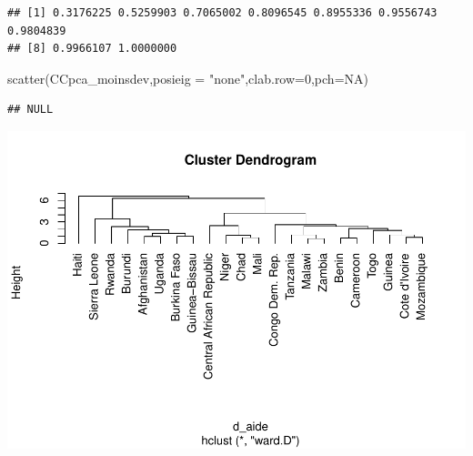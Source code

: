 \documentclass[
]{article}
\newenvironment{Shaded}{}{}
\newcommand{\AttributeTok}[1]{#1}
\newcommand{\ConstantTok}[1]{#1}
\newcommand{\DecValTok}[1]{#1}
\newcommand{\FunctionTok}[1]{#1}
\newcommand{\NormalTok}[1]{#1}
\newcommand{\SpecialCharTok}[1]{\textcolor[rgb]{0.00,0.50,0.50}{#1}}
\newcommand{\StringTok}[1]{\textcolor[rgb]{0.00,0.50,0.50}{#1}}
\begin{document}
\begin{verbatim}
## [1] 0.3176225 0.5259903 0.7065002 0.8096545 0.8955336 0.9556743 0.9804839
## [8] 0.9966107 1.0000000
\end{verbatim}

\begin{Shaded}
\begin{Highlighting}[]
\FunctionTok{scatter}\NormalTok{(CCpca\_moinsdev,}\AttributeTok{posieig =} \StringTok{"none"}\NormalTok{,}\AttributeTok{clab.row=}\DecValTok{0}\NormalTok{,}\AttributeTok{pch=}\ConstantTok{NA}\NormalTok{)}
\end{Highlighting}
\end{Shaded}

\begin{verbatim}
## NULL
\end{verbatim}

\begin{Shaded}
\end{Shaded}

\includegraphics{Projet_files/figure-latex/unnamed-chunk-42-1.pdf}
\end{document}

